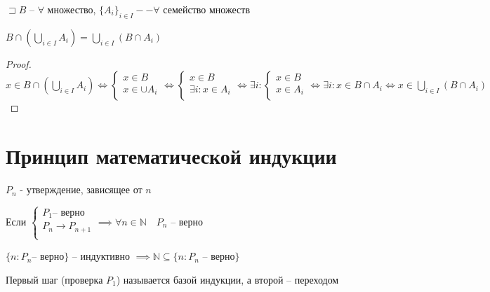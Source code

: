 \documentclass{book}
\newcommand\N{\ensuremath{\mathbb{N}}}
\theoremstyle{definition}
\begin{document}
        \begin{statement}
            $\sqsupset B$ -- $\forall $ множество, $\{A_i\}_{i\in I} -- \forall $ семейство множеств

            $B\cap \left( \bigcup\limits_{i \in  I} A_i \right)  = \bigcup\limits_{i \in  I} \left( B\cap A_i \right) $
        \end{statement}
        \begin{proof}
            $x\in B\cap \left( \bigcup\limits_{i \in  I} A_i \right) \iff \begin{cases}
                x\in B\\
                x\in \cup A_i\\
            \end{cases} \iff  \begin{cases}
                x\in B\\
                \exists i:x\in A_i\\
            \end{cases} \iff  \exists i: \begin{cases}
                x\in B\\
                x\in A_i\\
            \end{cases} \iff \exists i: x\in B\cap A_i \iff x\in  \bigcup\limits_{i \in  I} \left( B\cap A_i \right) $
        \end{proof}

        \section{Принцип математической индукции}

       $P_n$ - утверждение, зависящее от $n$

       Если $\begin{cases}
           P_1 \text{-- верно}\\
           P_n \to P_{n+1}\\
       \end{cases} \implies  \forall n\in \N\quad P_n$ -- верно

       $\{n: P_n \text{-- верно}\}$ -- индуктивно $\implies  \N \subseteq \{n:P_n \text{ -- верно}\}$

       Первый шаг (проверка $P_1$) называется базой индукции, а второй -- переходом
\end{document}
